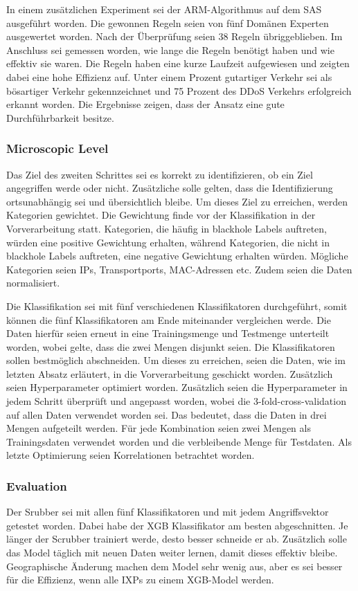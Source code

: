 \documentclass[sigplan,screen]{acmart}
\begin{document}
In einem zusätzlichen Experiment sei der ARM-Algorithmus auf dem SAS ausgeführt worden. Die gewonnen Regeln seien von fünf Domänen Experten ausgewertet worden. Nach der Überprüfung seien 38 Regeln übriggeblieben. Im Anschluss sei gemessen worden, wie lange die Regeln benötigt haben und wie effektiv sie waren. Die Regeln haben eine kurze Laufzeit aufgewiesen und zeigten dabei eine hohe Effizienz auf. Unter einem Prozent gutartiger Verkehr sei als bösartiger Verkehr gekennzeichnet und 75 Prozent des DDoS Verkehrs erfolgreich erkannt worden. Die Ergebnisse zeigen, dass der Ansatz eine gute Durchführbarkeit besitze.

\subsubsection{Microscopic Level}
Das Ziel des zweiten Schrittes sei es korrekt zu identifizieren, ob ein Ziel angegriffen werde oder nicht. Zusätzliche solle gelten, dass die Identifizierung ortsunabhängig sei und übersichtlich bleibe. Um dieses Ziel zu erreichen, werden Kategorien gewichtet. Die Gewichtung finde vor der Klassifikation in der Vorverarbeitung statt. Kategorien, die häufig in blackhole Labels auftreten, würden eine positive Gewichtung erhalten, während Kategorien, die nicht in blackhole Labels auftreten, eine negative Gewichtung erhalten würden. Mögliche Kategorien seien IPs, Transportports, MAC-Adressen etc. Zudem seien die Daten normalisiert.

Die Klassifikation sei mit fünf verschiedenen Klassifikatoren durchgeführt, somit können die fünf Klassifikatoren am Ende miteinander vergleichen werde. Die Daten hierfür seien erneut in eine Trainingsmenge und Testmenge unterteilt worden, wobei gelte, dass die zwei Mengen disjunkt seien. Die Klassifikatoren sollen bestmöglich abschneiden. Um dieses zu erreichen, seien die Daten, wie im letzten Absatz erläutert, in die Vorverarbeitung geschickt worden. Zusätzlich seien Hyperparameter optimiert worden. Zusätzlich seien die Hyperparameter in jedem Schritt überprüft und angepasst worden, wobei die 3-fold-cross-validation auf allen Daten verwendet worden sei. Das bedeutet, dass die Daten in drei Mengen aufgeteilt werden. Für jede Kombination seien zwei Mengen als Trainingsdaten verwendet worden und die verbleibende Menge für Testdaten. Als letzte Optimierung seien Korrelationen betrachtet worden.

\subsubsection{Evaluation}
Der Srubber sei mit allen fünf Klassifikatoren und mit jedem Angriffsvektor getestet worden. Dabei habe der XGB Klassifikator am besten abgeschnitten. Je länger der Scrubber trainiert werde, desto besser schneide er ab. Zusätzlich solle das Model täglich mit neuen Daten weiter lernen, damit dieses effektiv bleibe. Geographische Änderung machen dem Model sehr wenig aus, aber es sei besser für die Effizienz, wenn alle IXPs zu einem XGB-Model werden.
\end{document}
